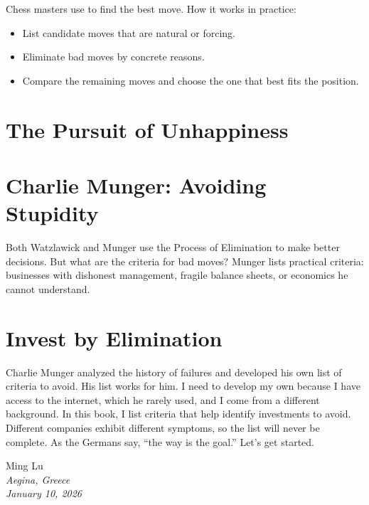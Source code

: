 Chess masters use  to find the best move.
How it works in practice:
\begin{itemize}
  \item List candidate moves that are natural or forcing.
  \item Eliminate bad moves by concrete reasons.
  \item Compare the remaining moves and choose the one that best fits the position.
\end{itemize}

\section*{The Pursuit of Unhappiness}


\section*{Charlie Munger: Avoiding Stupidity}


Both Watzlawick and Munger use the Process of Elimination to make better decisions.
But what are the criteria for bad moves? 
Munger lists practical criteria: businesses
with dishonest management, fragile balance sheets, or economics he cannot understand.

\section*{Invest by Elimination}
Charlie Munger analyzed the history of failures and developed his own list of criteria to avoid.
His list works for him. I need to develop my own because 
I have access to the internet, which he rarely used, and I come from a different background. 
In this book, I list criteria that help identify investments to avoid. 
Different companies exhibit different symptoms, so the list will never be complete. 
As the Germans say, ``the way is the goal.'' Let's get started.


\vspace{2em}
\begin{flushright}
Ming Lu\\
\emph{Aegina, Greece}\\
\emph{January 10, 2026}
\end{flushright}
